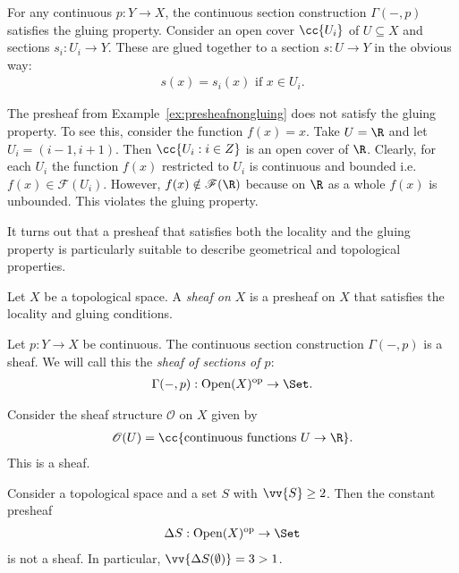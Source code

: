 \documentclass{article}
\begin{document}
\begin{example}
  For any continuous $p:Y\to X$, the continuous section construction
  $\Gamma(-,p)$ satisfies the gluing property. Consider an open cover
  $\cc{U_i}$ of $U\subseteq X$ and sections $s_i:U_i\to Y$. These are
  glued together to a section $s:U\to Y$ in the obvious way:
  \begin{align*}
    s(x) = s_i(x) \text{ if $x\in U_i$}.
  \end{align*}
\end{example}

\begin{example}
  The presheaf from Example~\ref{ex:presheafnongluing} does not satisfy the
  gluing property. To see this, consider the function $f(x) = x$. Take $U = \R$
  and let $U_i = (i-1, i+1)$. Then $\cc{U_i : i \in Z}$ is an open cover of
  $\R$. Clearly, for each $U_i$ the function $f(x)$ restricted to $U_i$ is
  continuous and bounded i.e. $f(x) \in \mathscr F(U_i)$. However, $f(x) \notin
  \mathscr F(\R)$ because on $\R$ as a whole $f(x)$ is unbounded. This violates
  the gluing property.
\end{example}

It turns out that a presheaf that satisfies both the locality and the
gluing property is particularly suitable to describe geometrical
and topological properties.

\begin{definition}
  Let $X$ be a topological space. A \emph{sheaf on $X$} is a presheaf
  on $X$ that satisfies the locality and gluing conditions.
\end{definition}

\begin{example}
  Let $p:Y\to X$ be continuous. The continuous section construction
  $\Gamma(-,p)$ is a sheaf. We will call this the \emph{sheaf of
  sections of $p$}:
  \begin{align*}
    \Gamma(-,p) : \Open(X)^{\text{op}} \to \Set.
  \end{align*}
\end{example}

\begin{example}
  Consider the sheaf structure $\mathscr O$ on $X$ given by
  \begin{align*}
    \mathscr O(U) = \cc{ \text{continuous functions }U\to\R}.
  \end{align*}
  This is a sheaf.
\end{example}

\begin{example}
  Consider a topological space and a set $S$ with $\vv{S}\geq 2$. Then the
  constant presheaf
  \begin{align*}
    \Delta S : \Open(X)^{\text{op}} \to \Set
  \end{align*}
  is not a sheaf. In particular, $\vv{\Delta S(\emptyset)} = 3 > 1$.
\end{example}
\end{document}
